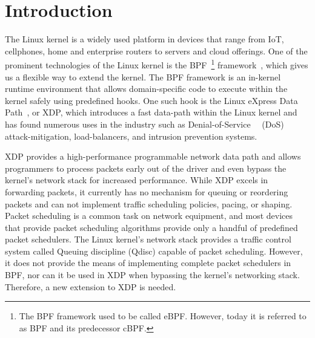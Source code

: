 \documentclass[sigconf, nonacm]{acmart}
\begin{document}

\maketitle

\section{Introduction}

The Linux kernel is a widely used platform in devices that range from IoT, cellphones, home and enterprise routers to servers and cloud offerings. One of the prominent technologies of the Linux kernel is the BPF~\footnote{The BPF framework used to be called eBPF. However, today it is referred to as BPF and its predecessor cBPF.} framework~\cite{ebpf}, which gives us a flexible way to extend the kernel. The BPF framework is an in-kernel runtime environment that allows domain-specific code to execute within the kernel safely using predefined hooks. One such hook is the Linux eXpress Data Path~\cite{hoiland2018express}, or XDP, which introduces a fast data-path within the Linux kernel and has found numerous uses in the industry such as Denial-of-Service~\cite{bertin2017xdp}~\cite{miano2019introducing} (DoS) attack-mitigation, load-balancers, and intrusion prevention systems.

XDP provides a high-performance programmable network data path and allows programmers to process packets early out of the driver and even bypass the kernel's network stack for increased performance. While XDP excels in forwarding packets, it currently has no mechanism for queuing or reordering packets and can not implement traffic scheduling policies, pacing, or shaping. Packet scheduling is a common task on network equipment, and most devices that provide packet scheduling algorithms provide only a handful of predefined packet schedulers. The Linux kernel's network stack provides a traffic control system called Queuing discipline (Qdisc) capable of packet scheduling. However, it does not provide the means of implementing complete packet schedulers in BPF, nor can it be used in XDP when bypassing the kernel's networking stack. Therefore, a new extension to XDP is needed.
\end{document}
